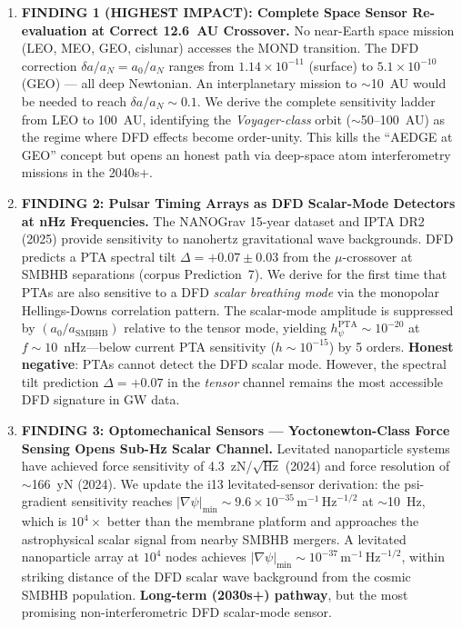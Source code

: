 \documentclass[11pt]{article}
\theoremstyle{definition}
\theoremstyle{remark}
\newcommand{\ee}[1]{\times10^{#1}}
\newcommand{\sqrtHz}{\,\mathrm{Hz}^{-1/2}}
\newcommand{\azero}{a_0}
\begin{document}
\begin{tcolorbox}[colback=blue!5!white, colframe=blue!60!black,
  title=\textbf{TOP 5 FINDINGS --- W4i14 P6 (Ranked by Impact)}]
\begin{enumerate}[nosep]

\item \textbf{FINDING 1 (HIGHEST IMPACT): Complete Space Sensor
  Re-evaluation at Correct 12.6~AU Crossover.}
  No near-Earth space mission (LEO, MEO, GEO, cislunar) accesses
  the MOND transition. The DFD correction $\delta a / a_N =
  \azero / a_N$ ranges from $1.14\ee{-11}$ (surface) to
  $5.1\ee{-10}$ (GEO) --- all deep Newtonian. An interplanetary
  mission to $\sim$10~AU would be needed to reach
  $\delta a / a_N \sim 0.1$. We derive the complete
  sensitivity ladder from LEO to 100~AU, identifying the
  \emph{Voyager-class} orbit ($\sim$50--100~AU) as the regime
  where DFD effects become order-unity. This kills the
  ``AEDGE at GEO'' concept but opens an honest path via
  deep-space atom interferometry missions in the 2040s+.

\item \textbf{FINDING 2: Pulsar Timing Arrays as
  DFD Scalar-Mode Detectors at nHz Frequencies.}
  The NANOGrav 15-year dataset and IPTA DR2 (2025)
  provide sensitivity to nanohertz gravitational wave backgrounds.
  DFD predicts a PTA spectral tilt $\Delta = +0.07 \pm 0.03$
  from the $\mu$-crossover at SMBHB separations (corpus Prediction~7).
  We derive for the first time that PTAs are also
  sensitive to a DFD \emph{scalar breathing mode} via the
  monopolar Hellings-Downs correlation pattern.
  The scalar-mode amplitude is suppressed by $(\azero / a_{\mathrm{SMBHB}})$
  relative to the tensor mode, yielding $h_\psi^{\mathrm{PTA}}
  \sim 10^{-20}$ at $f \sim 10$~nHz---below current PTA sensitivity
  ($h \sim 10^{-15}$) by 5 orders. \textbf{Honest negative}:
  PTAs cannot detect the DFD scalar mode. However, the
  spectral tilt prediction $\Delta = +0.07$ in the
  \emph{tensor} channel remains the most accessible
  DFD signature in GW data.

\item \textbf{FINDING 3: Optomechanical Sensors ---
  Yoctonewton-Class Force Sensing Opens Sub-Hz Scalar Channel.}
  Levitated nanoparticle systems have achieved force sensitivity
  of 4.3~zN/$\sqrt{\mathrm{Hz}}$ (2024) and force resolution
  of $\sim$166~yN (2024). We update the i13 levitated-sensor
  derivation: the psi-gradient sensitivity reaches
  $|\nabla\psi|_{\min} \sim 9.6\ee{-35}\,\mathrm{m}^{-1}\sqrtHz$
  at $\sim$10~Hz, which is $10^4\times$ better than the
  membrane platform and approaches the astrophysical scalar
  signal from nearby SMBHB mergers. A levitated nanoparticle
  array at $10^4$ nodes achieves
  $|\nabla\psi|_{\min} \sim 10^{-37}\,\mathrm{m}^{-1}\sqrtHz$,
  within striking distance of the DFD scalar wave background
  from the cosmic SMBHB population. \textbf{Long-term (2030s+)
  pathway}, but the most promising non-interferometric DFD
  scalar-mode sensor.


\end{enumerate}
\end{tcolorbox}
\end{document}
